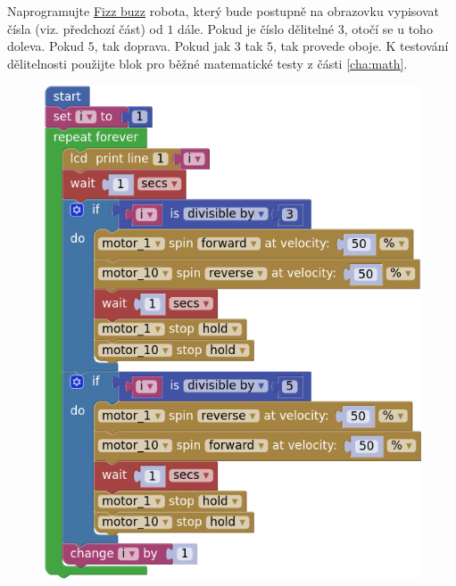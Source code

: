 \documentclass[../main.tex]{subfiles}
\begin{document}
	\begin{question*}
		Naprogramujte \href{https://en.wikipedia.org/wiki/Fizz\_buzz}{Fizz buzz} robota, který bude postupně na obrazovku vypisovat čísla (viz. předchozí část) od $1$ dále. Pokud je číslo dělitelné $3$, otočí se u toho doleva. Pokud $5$, tak doprava. Pokud jak $3$ tak $5$, tak provede oboje. K testování dělitelnosti použijte blok pro běžné matematické testy z části \ref{cha:math}.
	\end{question*}

	\begin{solution}
		\begin{figure}
			\centering
			\begin{minipage}{0.5\textwidth}
				\includegraphics[width=\linewidth]{Images/05/solfb.png}
			\end{minipage}
		\end{figure}
	\end{solution}
\end{document}
